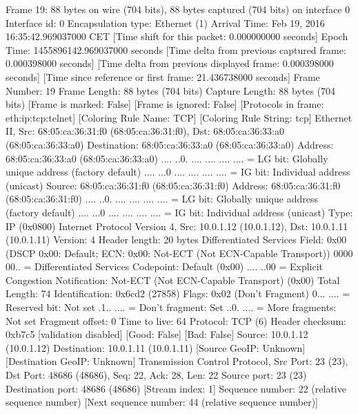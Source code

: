 Frame 19: 88 bytes on wire (704 bits), 88 bytes captured (704 bits) on interface 0
    Interface id: 0
    Encapsulation type: Ethernet (1)
    Arrival Time: Feb 19, 2016 16:35:42.969037000 CET
    [Time shift for this packet: 0.000000000 seconds]
    Epoch Time: 1455896142.969037000 seconds
    [Time delta from previous captured frame: 0.000398000 seconds]
    [Time delta from previous displayed frame: 0.000398000 seconds]
    [Time since reference or first frame: 21.436738000 seconds]
    Frame Number: 19
    Frame Length: 88 bytes (704 bits)
    Capture Length: 88 bytes (704 bits)
    [Frame is marked: False]
    [Frame is ignored: False]
    [Protocols in frame: eth:ip:tcp:telnet]
    [Coloring Rule Name: TCP]
    [Coloring Rule String: tcp]
Ethernet II, Src: 68:05:ca:36:31:f0 (68:05:ca:36:31:f0), Dst: 68:05:ca:36:33:a0 (68:05:ca:36:33:a0)
    Destination: 68:05:ca:36:33:a0 (68:05:ca:36:33:a0)
        Address: 68:05:ca:36:33:a0 (68:05:ca:36:33:a0)
        .... ..0. .... .... .... .... = LG bit: Globally unique address (factory default)
        .... ...0 .... .... .... .... = IG bit: Individual address (unicast)
    Source: 68:05:ca:36:31:f0 (68:05:ca:36:31:f0)
        Address: 68:05:ca:36:31:f0 (68:05:ca:36:31:f0)
        .... ..0. .... .... .... .... = LG bit: Globally unique address (factory default)
        .... ...0 .... .... .... .... = IG bit: Individual address (unicast)
    Type: IP (0x0800)
Internet Protocol Version 4, Src: 10.0.1.12 (10.0.1.12), Dst: 10.0.1.11 (10.0.1.11)
    Version: 4
    Header length: 20 bytes
    Differentiated Services Field: 0x00 (DSCP 0x00: Default; ECN: 0x00: Not-ECT (Not ECN-Capable Transport))
        0000 00.. = Differentiated Services Codepoint: Default (0x00)
        .... ..00 = Explicit Congestion Notification: Not-ECT (Not ECN-Capable Transport) (0x00)
    Total Length: 74
    Identification: 0x6cd2 (27858)
    Flags: 0x02 (Don't Fragment)
        0... .... = Reserved bit: Not set
        .1.. .... = Don't fragment: Set
        ..0. .... = More fragments: Not set
    Fragment offset: 0
    Time to live: 64
    Protocol: TCP (6)
    Header checksum: 0xb7c5 [validation disabled]
        [Good: False]
        [Bad: False]
    Source: 10.0.1.12 (10.0.1.12)
    Destination: 10.0.1.11 (10.0.1.11)
    [Source GeoIP: Unknown]
    [Destination GeoIP: Unknown]
Transmission Control Protocol, Src Port: 23 (23), Dst Port: 48686 (48686), Seq: 22, Ack: 28, Len: 22
    Source port: 23 (23)
    Destination port: 48686 (48686)
    [Stream index: 1]
    Sequence number: 22    (relative sequence number)
    [Next sequence number: 44    (relative sequence number)]
